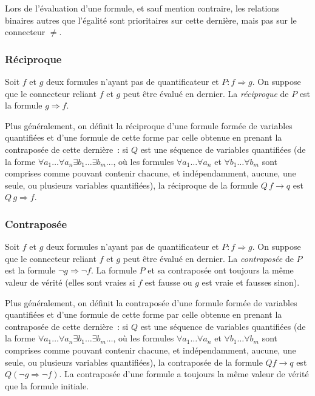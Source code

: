 Lors de l'évaluation d'une formule, et sauf mention contraire, les relations binaires autres que l'égalité sont prioritaires sur cette dernière, mais pas sur le connecteur $\neq$.

\subsubsection{Réciproque}

Soit $f$ et $g$ deux formules n'ayant pas de quantificateur et $P: f \Rightarrow g$. 
On suppose que le connecteur reliant $f$ et $g$ peut être évalué en dernier.
La \textit{réciproque} de $P$ est la formule $g \Rightarrow f$. 

Plus généralement, on définit la réciproque d'une formule formée de variables quantifiées et d'une formule de cette forme par celle obtenue en prenant la contraposée de cette dernière : si $Q$ est une séquence de variables quantifiées (de la forme $\forall a_1 \dots \forall a_n \exists b_1 \dots \exists b_m \dots$, où les formules $\forall a_1 \dots \forall a_n$ et $\forall b_1 \dots \forall b_m$ sont comprises comme pouvant contenir chacune, et indépendamment, aucune, une seule, ou plusieurs variables quantifiées), la réciproque de la formule $Q \, f \rightarrow q$ est $Q \, g \Rightarrow f$. 

\subsubsection{Contraposée}

Soit $f$ et $g$ deux formules n'ayant pas de quantificateur et $P: f \Rightarrow g$. 
On suppose que le connecteur reliant $f$ et $g$ peut être évalué en dernier.
La \textit{contraposée} de $P$ est la formule $\neg g \Rightarrow \neg f$. 
La formule $P$ et sa contraposée ont toujours la même valeur de vérité (elles sont vraies si $f$ est fausse ou $g$ est vraie et fausses sinon). 

Plus généralement, on définit la contraposée d'une formule formée de variables quantifiées et d'une formule de cette forme par celle obtenue en prenant la contraposée de cette dernière : si $Q$ est une séquence de variables quantifiées (de la forme $\forall a_1 \dots \forall a_n \exists b_1 \dots \exists b_m \dots$, où les formules $\forall a_1 \dots \forall a_n$ et $\forall b_1 \dots \forall b_m$ sont comprises comme pouvant contenir chacune, et indépendamment, aucune, une seule, ou plusieurs variables quantifiées), la contraposée de la formule $Q f \rightarrow q$ est $Q (\neg g \Rightarrow \neg f)$. 
La contraposée d'une formule a toujours la même valeur de vérité que la formule initiale.

